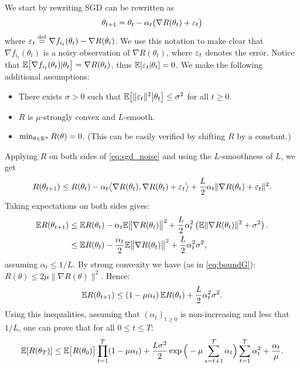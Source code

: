 \documentclass[11pt,nocut]{article}
\begin{document}
We start by rewriting SGD can be rewritten as
\begin{equation}\label{eq:sgd_noise}
\theta_{t+1} = \theta_t - \alpha_t \big(\nabla R(\theta_t) + {\varepsilon}_t \big)
\end{equation}
where ${\varepsilon}_t \overset{\rm def}{=} \nabla f_{i_t}(\theta_t) - \nabla R(\theta_t)$. 
We use this notation to make clear that $\nabla f_{i_t}(\theta_t)$ is a noisy observation of $\nabla R(\theta_t)$, where ${\varepsilon}_t$ denotes the error.
Notice that $\mathbb{E}\big[\nabla f_{i_t}(\theta_t)| \theta_t\big] = \nabla R(\theta_t)$, thus $\mathbb{E}[{\varepsilon}_t|\theta_t] = 0$.
We make the following additional assumptions:
\begin{itemize}
	\item There exists $\sigma>0$ such that $\mathbb{E}\big[\|{\varepsilon}_t\|^2\big|\theta_t\big] \leq \sigma^2$ for all $t \geq 0$.
	\item $R$ is $\mu$-strongly convex and $L$-smooth.
	\item $\min_{\theta \in \mathbb{R}^n} R(\theta) =0$. (This can be easily verified by shifting $R$ by a constant.)
\end{itemize}
\vspace{2mm}
Applying $R$ on both sides of \eqref{eq:sgd_noise} and using the $L$-smoothness of $L$, we get
\begin{align*}
	R(\theta_{t+1}) \leq R(\theta_t) - \alpha_t \big\langle \nabla R(\theta_t), \nabla R(\theta_t) + {\varepsilon}_t \big\rangle + \frac{L}{2} \alpha_t \| \nabla R(\theta_t) + {\varepsilon}_t \|^2.
\end{align*}
Taking expectations on both sides gives:
\begin{align*}
\mathbb{E} R(\theta_{t+1}) 
&\leq \mathbb{E} R(\theta_t) - \alpha_t \mathbb{E} \big\| \nabla R(\theta_t)\big\|^2 + \frac{L}{2}\alpha_t^2 \left( \mathbb{E} \| \nabla R(\theta_t) \|^2 + \sigma^2 \right).
\\
&\leq \mathbb{E} R(\theta_t) - \frac{\alpha_t}{2} \mathbb{E} \big\| \nabla R(\theta_t)\big\|^2 + \frac{L}{2}\alpha_t^2 \sigma^2,
\end{align*}
assuming $\alpha_t \leq 1/L$.
By strong convexity we have (as in \eqref{eq:boundG}): $R(\theta) \leq 2 \mu \|\nabla R(\theta)\|^2$. Hence:
$$
\mathbb{E} R(\theta_{t+1}) \leq \left(1 - \mu \alpha_t\right)\mathbb{E} R(\theta_t)  + \frac{L}{2}\alpha_t^2  \sigma^2 .
$$
Using this inequalities, assuming that $(\alpha_t)_{t \geq 0}$ is non-increasing and less that $1/L$, one can prove that for all $0 \leq t \leq T$:
$$
\mathbb{E} [R(\theta_{T})] \leq \mathbb{E} \big[R(\theta_0)\big] \prod_{t=1}^T (1-\mu \alpha_t) 
+ \frac{L \sigma^2}{2} \exp\Big(-\mu \sum_{s=t+1}^T \alpha_t\Big) \sum_{t=1}^T \alpha_t^2 + \frac{\alpha_t}{\mu}.
$$
\end{document}
